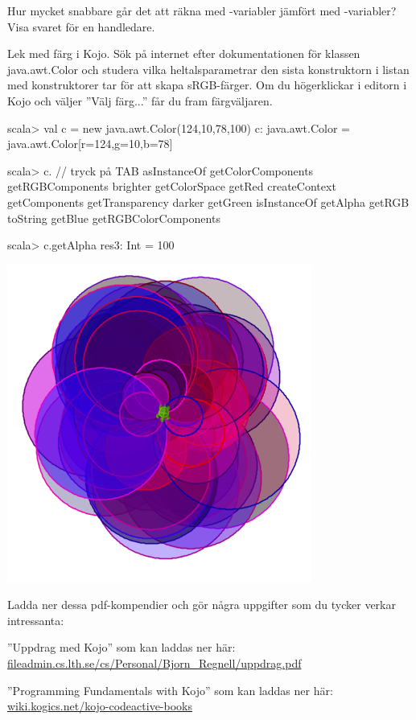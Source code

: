 \Subtask\Checkpoint Hur mycket snabbare går det att räkna med -variabler jämfört med -variabler? Visa svaret för en handledare.

\Task Lek med färg i Kojo. Sök på internet efter dokumentationen för klassen java.awt.Color och studera vilka heltalsparametrar den sista konstruktorn i listan med konstruktorer tar för att skapa sRGB-färger. Om du högerklickar i editorn i Kojo och väljer ''Välj färg...'' får du fram färgväljaren.

\begin{REPL}
scala> val c = new java.awt.Color(124,10,78,100)
c: java.awt.Color = java.awt.Color[r=124,g=10,b=78]

scala> c.  // tryck på TAB
asInstanceOf    getColorComponents      getRGBComponents   
brighter        getColorSpace           getRed             
createContext   getComponents           getTransparency    
darker          getGreen                isInstanceOf       
getAlpha        getRGB                  toString           
getBlue         getRGBColorComponents                      

scala> c.getAlpha
res3: Int = 100
\end{REPL}

\includegraphics[width=0.75\textwidth]{../img/kojo/random-color-circles.png}


\Task Ladda ner dessa pdf-kompendier och gör några uppgifter som du tycker verkar intressanta:

\Subtask ''Uppdrag med Kojo'' som kan laddas ner här:\\ \href{http://fileadmin.cs.lth.se/cs/Personal/Bjorn_Regnell/uppdrag.pdf}{fileadmin.cs.lth.se/cs/Personal/Bjorn\_Regnell/uppdrag.pdf}

\Subtask ''Programming Fundamentals with Kojo'' som kan laddas ner här:\\
 \href{http://wiki.kogics.net/kojo-codeactive-books}{wiki.kogics.net/kojo-codeactive-books}